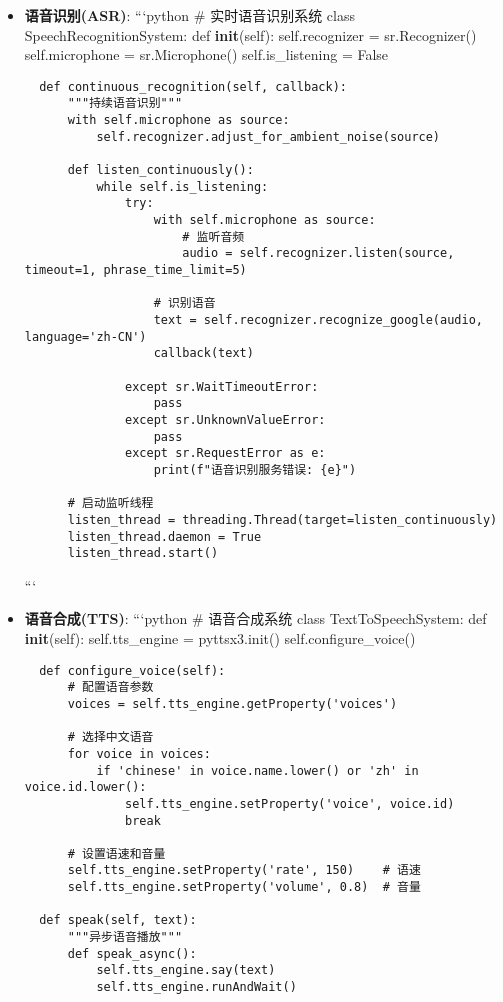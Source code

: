 \begin{itemize}
\item
  \textbf{语音识别(ASR)}: ```python \# 实时语音识别系统 class
  SpeechRecognitionSystem: def \textbf{init}(self): self.recognizer =
  sr.Recognizer() self.microphone = sr.Microphone() self.is\_listening =
  False

\begin{lstlisting}
  def continuous_recognition(self, callback):
      """持续语音识别"""
      with self.microphone as source:
          self.recognizer.adjust_for_ambient_noise(source)

      def listen_continuously():
          while self.is_listening:
              try:
                  with self.microphone as source:
                      # 监听音频
                      audio = self.recognizer.listen(source, timeout=1, phrase_time_limit=5)

                  # 识别语音
                  text = self.recognizer.recognize_google(audio, language='zh-CN')
                  callback(text)

              except sr.WaitTimeoutError:
                  pass
              except sr.UnknownValueError:
                  pass
              except sr.RequestError as e:
                  print(f"语音识别服务错误: {e}")

      # 启动监听线程
      listen_thread = threading.Thread(target=listen_continuously)
      listen_thread.daemon = True
      listen_thread.start()
\end{lstlisting}

  ```
\item
  \textbf{语音合成(TTS)}: ```python \# 语音合成系统 class
  TextToSpeechSystem: def \textbf{init}(self): self.tts\_engine =
  pyttsx3.init() self.configure\_voice()

\begin{lstlisting}
  def configure_voice(self):
      # 配置语音参数
      voices = self.tts_engine.getProperty('voices')

      # 选择中文语音
      for voice in voices:
          if 'chinese' in voice.name.lower() or 'zh' in voice.id.lower():
              self.tts_engine.setProperty('voice', voice.id)
              break

      # 设置语速和音量
      self.tts_engine.setProperty('rate', 150)    # 语速
      self.tts_engine.setProperty('volume', 0.8)  # 音量

  def speak(self, text):
      """异步语音播放"""
      def speak_async():
          self.tts_engine.say(text)
          self.tts_engine.runAndWait()


\end{lstlisting}
\end{itemize}
